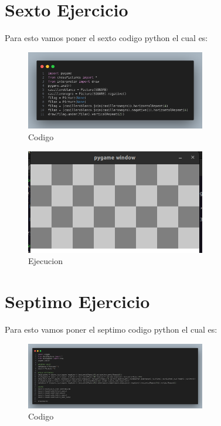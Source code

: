 \documentclass[10pt, a4paper]{article}
\begin{document}
\section{Sexto Ejercicio}
Para esto vamos poner el sexto codigo python el cual es:  
\begin{figure}[H]
  \centering
  \includegraphics[width=0.7\textwidth]{img/Ej6.png}
  \caption{Codigo}
\end{figure}

\begin{figure}[H]
  \centering
  \includegraphics[width=0.7\textwidth]{img/Ejercicio6.png}
  \caption{Ejecucion}
\end{figure}

\section{Septimo Ejercicio}
Para esto vamos poner el septimo codigo python el cual es:  
\begin{figure}[H]
  \centering
  \includegraphics[width=0.7\textwidth]{img/Ej7.png}
  \caption{Codigo}
\end{figure}
\end{document}
